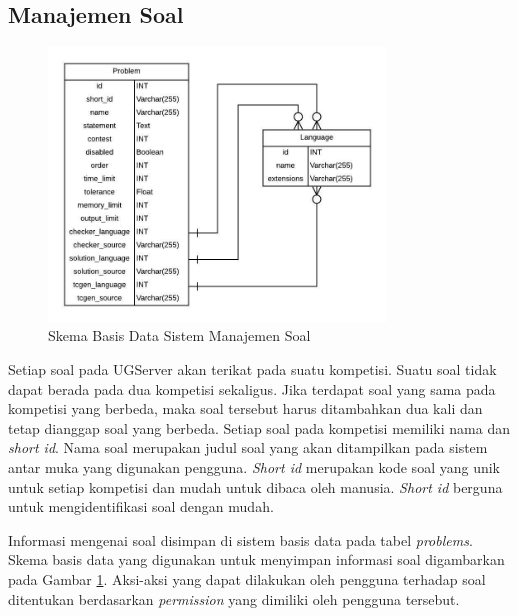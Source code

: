 
\subsection{Manajemen Soal}

\begin{figure}[ht!]
    \centering
    \includegraphics[width=0.8\textwidth]{images/problem-schema}
    \caption{Skema Basis Data Sistem Manajemen Soal}
    \label{fig:problem-schema}
\end{figure}

\par Setiap soal pada UGServer akan terikat pada suatu kompetisi. Suatu soal tidak dapat berada pada dua kompetisi sekaligus. Jika terdapat soal yang sama pada kompetisi yang berbeda, maka soal tersebut harus ditambahkan dua kali dan tetap dianggap soal yang berbeda. Setiap soal pada kompetisi memiliki nama dan \textit{short id}. Nama soal merupakan judul soal yang akan ditampilkan pada sistem antar muka yang digunakan pengguna. \textit{Short id} merupakan kode soal yang unik untuk setiap kompetisi dan mudah untuk dibaca oleh manusia. \textit{Short id} berguna untuk mengidentifikasi soal dengan mudah.

\par Informasi mengenai soal disimpan di sistem basis data pada tabel \textit{problems}. Skema basis data yang digunakan untuk menyimpan informasi soal digambarkan pada Gambar \ref{fig:problem-schema}. Aksi-aksi yang dapat dilakukan oleh pengguna terhadap soal ditentukan berdasarkan \textit{permission} yang dimiliki oleh pengguna tersebut.


